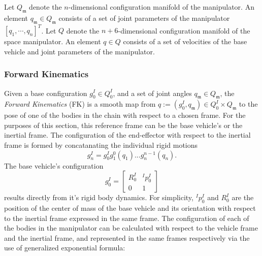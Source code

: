 \documentclass[lettersize,journal]{IEEEtran}
\begin{document}
Let $Q_\mathfrak{m}$ denote the $n$-dimensional configuration manifold of the manipulator. An element $q_\mathfrak{m} \in Q_\mathfrak{m}$ consists of a set of joint parameters of the manipulator $[q_1,\cdots,q_n]^T$. Let $Q$ denote the $n+6$-dimensional configuration manifold of the space manipulator. An element $q \in Q$ consists of a set of velocities of the base vehicle and joint parameters of the manipulator.%
\subsubsection{Forward Kinematics}
\label{forwardkinematics}
Given a base configuration $g^I_0 \in Q_0^I$, and a set of joint angles $q_\mathfrak{m} \in Q_\mathfrak{m}$,  %
the \textit{Forward Kinematics} (FK) is a smooth map from $q:=(g^I_0 ,q_\mathfrak{m}) \in Q^I_0 \times Q_\mathfrak{m}$ to the pose of one of the bodies in the chain with respect to a chosen frame. For the purposes of this section, this reference frame can be the base vehicle's or the inertial frame.
The configuration of the end-effector with respect to the inertial frame is formed by concatanating the individual rigid motions
\begin{equation}
    g^I_{n}=g^I_{0}g^0_1(q_1)...g^{n-1}_{n}(q_{n}).
\end{equation}
The base vehicle's configuration 
\begin{equation}
    g^I_0 =\begin{bmatrix}R^I_0 & ^Ip^I_0\\0&1\end{bmatrix}
\end{equation}
results directly from it's rigid body dynamics. For simplicity, $^Ip^I_0$ and $R^I_0$ are the position of the center of mass of the base vehicle and its orientation with respect to the inertial frame expressed in the same frame. %
The configuration of each of the bodies in the manipulator can be calculated with respect to the vehicle frame and the inertial frame, and represented in the same frames respectively via the use of generalized exponential formula:
\end{document}
